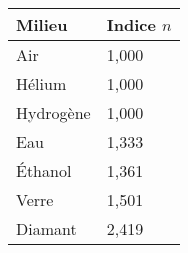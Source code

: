 {\scriptsize
\begin{tabular}{||m{2cm} m{1.5cm}||}
    \hline
    Milieu & Indice $n$ \\ [0.5ex] 
    \hline\hline
    Air & 1,000 \\
    Hélium & 1,000 \\
    Hydrogène & 1,000 \\
    Eau & 1,333 \\
    Éthanol & 1,361 \\
    Verre & 1,501 \\
    Diamant & 2,419 \\
    \hline
\end{tabular}
}